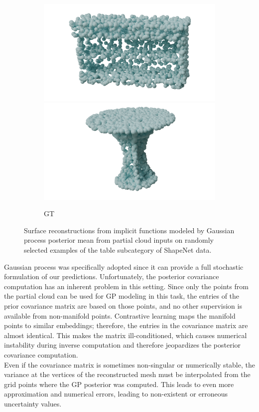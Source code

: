 \begin{figure}[htb]
\begin{subfigure}[t]{0.315\textwidth}
    \includegraphics[width=\textwidth]{figures/gp/t2cgp.png}
    \includegraphics[width=\textwidth]{figures/gp/t3cgp.png}
    \caption{GT}\label{fig:gptable3}
  \end{subfigure}
  \caption{Surface reconstructions from implicit functions modeled by Gaussian process posterior mean from partial cloud inputs on randomly selected examples of the table subcategory of ShapeNet data.}
  \label{fig:gptable}
\end{figure}
\newline

Gaussian process was specifically adopted since it can provide a full stochastic formulation of our predictions. Unfortunately, the posterior covariance computation has an inherent problem in this setting. Since only the points from the partial cloud can be used for GP modeling in this task, the entries of the prior covariance matrix are based on those points, and no other supervision is available from non-manifold points. Contrastive learning maps the manifold points to similar embeddings; therefore, the entries in the covariance matrix are almost identical. This makes the matrix ill-conditioned, which causes numerical instability during inverse computation and therefore jeopardizes the posterior covariance computation.
\\
Even if the covariance matrix is sometimes non-singular or numerically stable, the variance at the vertices of the reconstructed mesh must be interpolated from the grid points where the GP posterior was computed. This leads to even more approximation and numerical errors, leading to non-existent or erroneous uncertainty values.